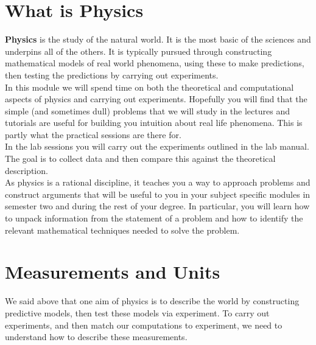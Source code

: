 \documentclass[a4paper,12pt]{book}
\begin{document}
\section{What is Physics}
\textbf{Physics} is the study of the natural world. It is the most basic of the sciences and underpins all of the others. It is typically pursued through constructing mathematical models of real world phenomena, using these to make predictions, then testing the predictions by carrying out experiments.\\

In this module we will spend time on both the theoretical and computational aspects of physics and carrying out experiments.  Hopefully you will find that the simple (and sometimes dull) problems that we will study in the lectures and tutorials are useful for building you intuition about real life phenomena. This is partly what the practical sessions are there for.\\

In the lab sessions you will carry out the experiments outlined in the lab manual. The goal is to collect data and then compare this against the theoretical description.\\

As physics is a rational discipline, it teaches you a way to approach problems and construct arguments that will be useful to you in your subject specific modules in semester two and during the rest of your degree.  In particular, you will learn how to unpack information from the statement of a problem and how to identify the relevant mathematical techniques needed to solve the problem.

\section{Measurements and Units}
We said above that one aim of physics is to describe the world by constructing predictive models, then test these models via experiment. To carry out experiments, and then match our computations to experiment, we need to understand how to describe these measurements. \\
\end{document}
